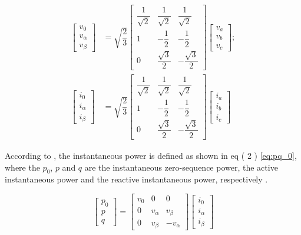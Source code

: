 \begin{equation}
\begin{aligned}
\begin{bmatrix}
v_0\\
v_\alpha\\
v_\beta
\end{bmatrix}
& = \sqrt{\dfrac{2}{3}}
\begin{bmatrix}
\dfrac{1}{\sqrt{2}}	& \dfrac{1}{\sqrt{2}}	& \dfrac{1}{\sqrt{2}}		\\[2ex]
1					& -\dfrac{1}{2}			& -\dfrac{1}{2}				\\[2ex]
0					& \dfrac{\sqrt{3}}{2}	& -\dfrac{\sqrt{3}}{2}
\end{bmatrix}
\begin{bmatrix}
v_a\\
v_b\\
v_c
\end{bmatrix}
;\\
\begin{bmatrix}
i_0\\
i_\alpha\\
i_\beta
\end{bmatrix}
& = \sqrt{\dfrac{2}{3}}
\begin{bmatrix}
\dfrac{1}{\sqrt{2}}	& \dfrac{1}{\sqrt{2}}	& \dfrac{1}{\sqrt{2}}		\\[2ex]
1					& -\dfrac{1}{2}			& -\dfrac{1}{2}				\\[2ex]
0					& \dfrac{\sqrt{3}}{2}	& -\dfrac{\sqrt{3}}{2}
\end{bmatrix}
\begin{bmatrix}
i_a\\
i_b\\
i_c
\end{bmatrix}
\label{eq:Clarke}
\end{aligned}
\end{equation} 

According to \cite{Akagi2007}, the instantaneous power is defined as shown in eq ( 2 ) \ref{eq:pq_0}, where the $p_0$, $p$ and $q$ are the instantaneous zero-sequence power, the active instantaneous power and the reactive instantaneous power, respectively \cite{Akagi2006,Peng1996}.

\begin{equation}
\begin{bmatrix}
p_0\\
p\\
q
\end{bmatrix}=
\begin{bmatrix}
v_0		&	0			&	0\\
0		&	v_{\alpha}	&	v_{\beta}\\
0		&	v_{\beta}	&	-v_{\alpha}
\end{bmatrix}
\begin{bmatrix}
i_{0}\\
i_{\alpha}\\
i_{\beta}
\end{bmatrix}
\label{eq:pq_0}
\end{equation} 

